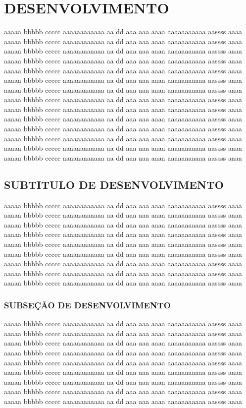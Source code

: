 \chapter{DESENVOLVIMENTO}
aaaaa bbbbb ccccc aaaaaaaaaaaa aa dd  aaa aaa aaaa aaaaaaaaaaa aassss aaaa 
aaaaa bbbbb ccccc aaaaaaaaaaaa aa dd  aaa aaa aaaa aaaaaaaaaaa aassss aaaa
aaaaa bbbbb ccccc aaaaaaaaaaaa aa dd  aaa aaa aaaa aaaaaaaaaaa aassss aaaa
aaaaa bbbbb ccccc aaaaaaaaaaaa aa dd  aaa aaa aaaa aaaaaaaaaaa aassss aaaa
aaaaa bbbbb ccccc aaaaaaaaaaaa aa dd  aaa aaa aaaa aaaaaaaaaaa aassss aaaa
aaaaa bbbbb ccccc aaaaaaaaaaaa aa dd  aaa aaa aaaa aaaaaaaaaaa aassss aaaa
aaaaa bbbbb ccccc aaaaaaaaaaaa aa dd  aaa aaa aaaa aaaaaaaaaaa aassss aaaa
aaaaa bbbbb ccccc aaaaaaaaaaaa aa dd  aaa aaa aaaa aaaaaaaaaaa aassss aaaa
aaaaa bbbbb ccccc aaaaaaaaaaaa aa dd  aaa aaa aaaa aaaaaaaaaaa aassss aaaa
aaaaa bbbbb ccccc aaaaaaaaaaaa aa dd  aaa aaa aaaa aaaaaaaaaaa aassss aaaa
aaaaa bbbbb ccccc aaaaaaaaaaaa aa dd  aaa aaa aaaa aaaaaaaaaaa aassss aaaa
aaaaa bbbbb ccccc aaaaaaaaaaaa aa dd  aaa aaa aaaa aaaaaaaaaaa aassss aaaa
aaaaa bbbbb ccccc aaaaaaaaaaaa aa dd  aaa aaa aaaa aaaaaaaaaaa aassss aaaa
aaaaa bbbbb ccccc aaaaaaaaaaaa aa dd  aaa aaa aaaa aaaaaaaaaaa aassss aaaa

\section{SUBTITULO DE DESENVOLVIMENTO}
aaaaa bbbbb ccccc aaaaaaaaaaaa aa dd  aaa aaa aaaa aaaaaaaaaaa aassss aaaa
aaaaa bbbbb ccccc aaaaaaaaaaaa aa dd  aaa aaa aaaa aaaaaaaaaaa aassss aaaa
aaaaa bbbbb ccccc aaaaaaaaaaaa aa dd  aaa aaa aaaa aaaaaaaaaaa aassss aaaa
aaaaa bbbbb ccccc aaaaaaaaaaaa aa dd  aaa aaa aaaa aaaaaaaaaaa aassss aaaa
aaaaa bbbbb ccccc aaaaaaaaaaaa aa dd  aaa aaa aaaa aaaaaaaaaaa aassss aaaa
aaaaa bbbbb ccccc aaaaaaaaaaaa aa dd  aaa aaa aaaa aaaaaaaaaaa aassss aaaa
aaaaa bbbbb ccccc aaaaaaaaaaaa aa dd  aaa aaa aaaa aaaaaaaaaaa aassss aaaa
aaaaa bbbbb ccccc aaaaaaaaaaaa aa dd  aaa aaa aaaa aaaaaaaaaaa aassss aaaa
aaaaa bbbbb ccccc aaaaaaaaaaaa aa dd  aaa aaa aaaa aaaaaaaaaaa aassss aaaa
\subsection{SUBSEÇÃO DE DESENVOLVIMENTO}
aaaaa bbbbb ccccc aaaaaaaaaaaa aa dd  aaa aaa aaaa aaaaaaaaaaa aassss aaaa
aaaaa bbbbb ccccc aaaaaaaaaaaa aa dd  aaa aaa aaaa aaaaaaaaaaa aassss aaaa
aaaaa bbbbb ccccc aaaaaaaaaaaa aa dd  aaa aaa aaaa aaaaaaaaaaa aassss aaaa
aaaaa bbbbb ccccc aaaaaaaaaaaa aa dd  aaa aaa aaaa aaaaaaaaaaa aassss aaaa
aaaaa bbbbb ccccc aaaaaaaaaaaa aa dd  aaa aaa aaaa aaaaaaaaaaa aassss aaaa
aaaaa bbbbb ccccc aaaaaaaaaaaa aa dd  aaa aaa aaaa aaaaaaaaaaa aassss aaaa
aaaaa bbbbb ccccc aaaaaaaaaaaa aa dd  aaa aaa aaaa aaaaaaaaaaa aassss aaaa
aaaaa bbbbb ccccc aaaaaaaaaaaa aa dd  aaa aaa aaaa aaaaaaaaaaa aassss aaaa
aaaaa bbbbb ccccc aaaaaaaaaaaa aa dd  aaa aaa aaaa aaaaaaaaaaa aassss aaaa
